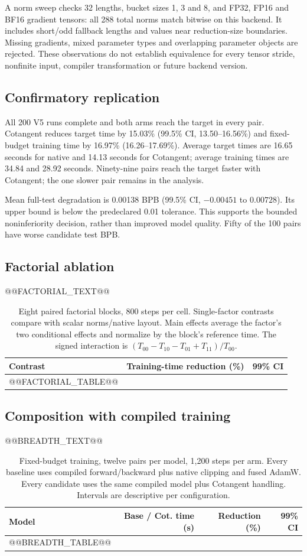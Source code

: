 \documentclass[11pt]{article}
\begin{document}
A norm sweep checks 32 lengths, bucket sizes 1, 3 and 8, and FP32, FP16 and
BF16 gradient tensors: all 288 total norms match bitwise on this backend.
It includes short/odd fallback lengths and values near reduction-size boundaries.
Missing gradients, mixed parameter types and overlapping parameter objects are
rejected. These observations do not establish equivalence for every tensor
stride, nonfinite input, compiler transformation or future backend version.

\subsection{Confirmatory replication}
All 200 V5 runs complete and both arms reach the target in every pair.
Cotangent reduces target time by 15.03\% (99.5\% CI, 13.50--16.56\%) and
fixed-budget training time by 16.97\% (16.26--17.69\%). Average target times
are 16.65 seconds for native and 14.13 seconds for Cotangent; average training
times are 34.84 and 28.92 seconds. Ninety-nine pairs reach the target faster
with Cotangent; the one slower pair remains in the analysis.

Mean full-test degradation is 0.00138 BPB (99.5\% CI, $-0.00451$ to
$0.00728$). Its upper bound is below the predeclared 0.01 tolerance. This
supports the bounded noninferiority decision, rather than improved model
quality. Fifty of the 100 pairs have worse candidate test BPB.

\subsection{Factorial ablation}
@@FACTORIAL_TEXT@@
\begin{table}[t]
\centering
\begin{tabular}{lrr}
\toprule
Contrast & Training-time reduction (\%) & 99\% CI\\
\midrule
@@FACTORIAL_TABLE@@
\bottomrule
\end{tabular}
\caption{Eight paired factorial blocks, 800 steps per cell. Single-factor
contrasts compare with scalar norms/native layout. Main effects average the
factor's two conditional effects and normalize by the block's reference time.
The signed interaction is $(T_{00}-T_{10}-T_{01}+T_{11})/T_{00}$.}
\label{tab:factorial}
\end{table}

\subsection{Composition with compiled training}
@@BREADTH_TEXT@@
\begin{table}[t]
\centering
\small
\begin{tabular}{lrrr}
\toprule
Model & Base / Cot. time (s) & Reduction (\%) & 99\% CI\\
\midrule
@@BREADTH_TABLE@@
\bottomrule
\end{tabular}
\caption{Fixed-budget training, twelve pairs per model, 1,200 steps per arm.
Every baseline uses compiled forward/backward plus native clipping and fused
AdamW. Every candidate uses the same compiled model plus Cotangent handling.
Intervals are descriptive per configuration.}
\label{tab:breadth}
\end{table}
\end{document}
